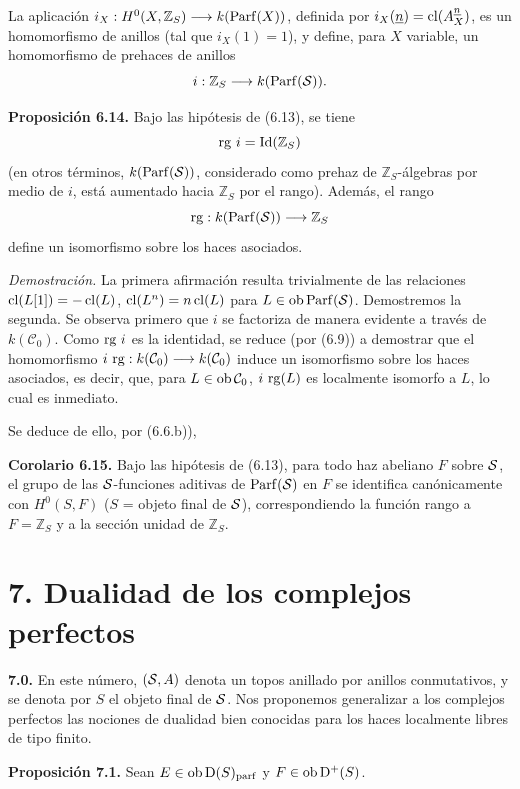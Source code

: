 La aplicación \(i_X:H^0(X,\mathbb Z_S)\longrightarrow k(\Parf(X))\), definida por \(i_X(\underline n)=\cl(A_X^{\underline n})\), es un homomorfismo de anillos (tal que \(i_X(1)=1\)), y define, para \(X\) variable, un homomorfismo de prehaces de anillos
\[
  i:\mathbb Z_S\longrightarrow k(\Parf(\sisi{S}{\mathcal S})).
\]

\textbf{Proposición 6.14.} Bajo las hipótesis de (6.13), se tiene
\[
  \rg\, i=\Id(\mathbb Z_S)
\]
(en otros términos, \(k(\Parf(\sisi{S}{\mathcal S}))\), considerado como prehaz de \(\mathbb Z_S\)-álgebras por medio de \(i\), está aumentado hacia \(\mathbb Z_S\) por el rango). Además, el rango
\[
  \rg:k(\Parf(\sisi{S}{\mathcal S}))\longrightarrow\mathbb Z_S
\]
define un isomorfismo sobre los haces asociados.

\emph{Demostración.} La primera afirmación resulta trivialmente de las relaciones \(\cl(L[1])=-\cl(L)\), \(\cl(L^n)=n\cl(L)\) para \(L\in\Ob\Parf(\sisi{S}{\mathcal S})\). Demostremos la segunda. Se observa primero que \(i\) se factoriza de manera evidente a través de \(k(\mathcal C_0)\). Como \(\rg\, i\) es la identidad, se reduce (por (6.9)) a demostrar que el homomorfismo \(i\, \rg:k(\mathcal C_0)\longrightarrow k(\mathcal C_0)\) induce un isomorfismo sobre los haces asociados, es decir, que, para \(L\in\Ob\mathcal C_0\), \(i\, \rg(L)\) es localmente isomorfo a \(L\), lo cual es inmediato.

Se deduce de ello, por (6.6.b)),

\textbf{Corolario 6.15.} Bajo las hipótesis de (6.13), para todo haz abeliano \(F\) sobre \(\sisi{S}{\mathcal S}\), el grupo de las \(\sisi{S}{\mathcal S}\)-funciones aditivas de \(\Parf(\sisi{S}{\mathcal S})\) en \(F\) se identifica canónicamente con \(H^0(S,F)\) (\(S\) = objeto final de \(\sisi{S}{\mathcal S}\)), correspondiendo la función rango a \(F=\mathbb Z_S\) y a la sección unidad de \(\mathbb Z_S\).

\section*{7. Dualidad de los complejos perfectos}

\textbf{7.0.} En este número, \((\sisi{S}{\mathcal S},A)\) denota un topos anillado por anillos conmutativos, y se denota por \(S\) el objeto final de \(\sisi{S}{\mathcal S}\). Nos proponemos generalizar a los complejos perfectos las nociones de dualidad bien conocidas para los haces localmente libres de tipo finito.

\textbf{Proposición 7.1.} Sean \(E\in\Ob\Dpx(S)_{\mathrm{parf}}\) y \(F\in\Ob\Dpx^+(S)\).

